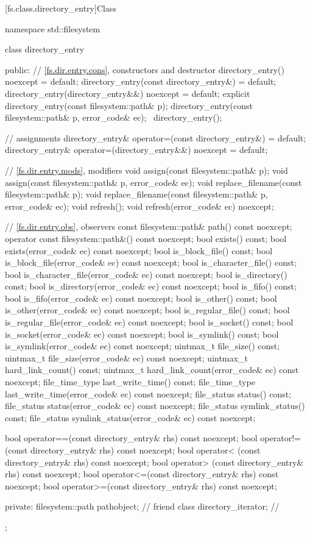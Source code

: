 [fs.class.directory_entry]{Class }

%
\begin{codeblock}
namespace std::filesystem {
  class directory_entry {
  public:
    // \ref{fs.dir.entry.cons}, constructors and destructor
    directory_entry() noexcept = default;
    directory_entry(const directory_entry&) = default;
    directory_entry(directory_entry&&) noexcept = default;
    explicit directory_entry(const filesystem::path& p);
    directory_entry(const filesystem::path& p, error_code& ec);
    ~directory_entry();

    // assignments
    directory_entry& operator=(const directory_entry&) = default;
    directory_entry& operator=(directory_entry&&) noexcept = default;

    // \ref{fs.dir.entry.mods}, modifiers
    void assign(const filesystem::path& p);
    void assign(const filesystem::path& p, error_code& ec);
    void replace_filename(const filesystem::path& p);
    void replace_filename(const filesystem::path& p, error_code& ec);
    void refresh();
    void refresh(error_code& ec) noexcept;

    // \ref{fs.dir.entry.obs}, observers
    const filesystem::path& path() const noexcept;
    operator const filesystem::path&() const noexcept;
    bool exists() const;
    bool exists(error_code& ec) const noexcept;
    bool is_block_file() const;
    bool is_block_file(error_code& ec) const noexcept;
    bool is_character_file() const;
    bool is_character_file(error_code& ec) const noexcept;
    bool is_directory() const;
    bool is_directory(error_code& ec) const noexcept;
    bool is_fifo() const;
    bool is_fifo(error_code& ec) const noexcept;
    bool is_other() const;
    bool is_other(error_code& ec) const noexcept;
    bool is_regular_file() const;
    bool is_regular_file(error_code& ec) const noexcept;
    bool is_socket() const;
    bool is_socket(error_code& ec) const noexcept;
    bool is_symlink() const;
    bool is_symlink(error_code& ec) const noexcept;
    uintmax_t file_size() const;
    uintmax_t file_size(error_code& ec) const noexcept;
    uintmax_t hard_link_count() const;
    uintmax_t hard_link_count(error_code& ec) const noexcept;
    file_time_type last_write_time() const;
    file_time_type last_write_time(error_code& ec) const noexcept;
    file_status status() const;
    file_status status(error_code& ec) const noexcept;
    file_status symlink_status() const;
    file_status symlink_status(error_code& ec) const noexcept;

    bool operator==(const directory_entry& rhs) const noexcept;
    bool operator!=(const directory_entry& rhs) const noexcept;
    bool operator< (const directory_entry& rhs) const noexcept;
    bool operator> (const directory_entry& rhs) const noexcept;
    bool operator<=(const directory_entry& rhs) const noexcept;
    bool operator>=(const directory_entry& rhs) const noexcept;

  private:
    filesystem::path pathobject;     // \expos
    friend class directory_iterator; // \expos
  };
}
\end{codeblock}
